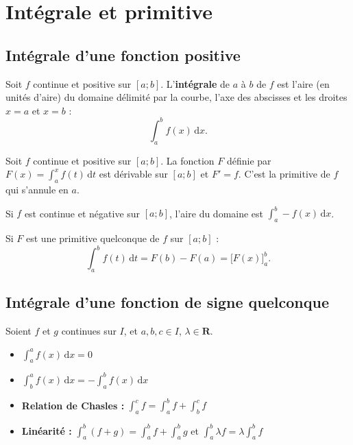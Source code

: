 \documentclass[11pt,a4paper,openany]{book}
\theoremstyle{definition}
\begin{document}
    \section{Intégrale et primitive}
    \subsection{Intégrale d'une fonction positive}
    \begin{Définition}
        Soit $f$ continue et positive sur $[a;b]$. L'\textbf{intégrale} de $a$ à $b$ de $f$
        est l'aire (en unités d'aire) du domaine délimité par la courbe, l'axe des abscisses
        et les droites $x=a$ et $x=b$ :
        \[
            \int_a^b f(x)\,\mathrm{d}x.
        \]
    \end{Définition}

    \begin{Théorème}
        Soit $f$ continue et positive sur $[a;b]$. La fonction $F$ définie par
        $F(x)=\int_a^x f(t)\,\mathrm{d}t$ est dérivable sur $[a;b]$ et $F'=f$.
        C'est la primitive de $f$ qui s'annule en $a$.
    \end{Théorème}

    \begin{Propriété}
        Si $f$ est continue et négative sur $[a;b]$, l'aire du domaine est
        $\displaystyle\int_a^b -f(x)\,\mathrm{d}x$.
    \end{Propriété}

    \begin{Propriété}
        Si $F$ est une primitive quelconque de $f$ sur $[a;b]$ :
        \[
            \int_a^b f(t)\,\mathrm{d}t = F(b)-F(a) = \bigl[F(x)\bigr]_a^b.
        \]
    \end{Propriété}

    \subsection{Intégrale d'une fonction de signe quelconque}
    \begin{Propriété}
        Soient $f$ et $g$ continues sur $I$, et $a,b,c\in I$, $\lambda\in\mathbf{R}$.
        \begin{itemize}
            \item $\int_a^a f(x)\,\mathrm{d}x=0$
            \item $\int_b^a f(x)\,\mathrm{d}x=-\int_a^b f(x)\,\mathrm{d}x$
            \item \textbf{Relation de Chasles :}
                  $\int_a^c f = \int_a^b f + \int_b^c f$
            \item \textbf{Linéarité :}
                  $\int_a^b(f+g) = \int_a^b f + \int_a^b g$ et
                  $\int_a^b\lambda f = \lambda\int_a^b f$
        \end{itemize}
    \end{Propriété}
\end{document}
